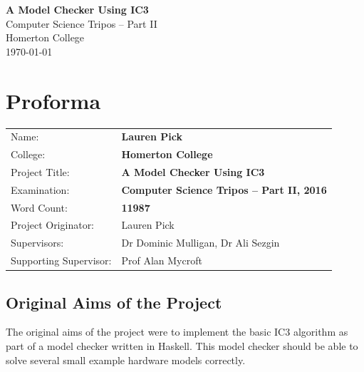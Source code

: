\documentclass[12pt,a4paper,twoside,openright]{report}
\begin{document}






\pagestyle{empty}


\vspace*{60mm}
\begin{center}
\Huge
\textbf{A Model Checker Using IC3} \\[5mm]
Computer Science Tripos -- Part II \\[5mm]
Homerton College \\[5mm]
\today  %
\end{center}


\pagestyle{plain}

\chapter*{Proforma}

{\large
\begin{tabular}{ll}
Name:                  & \bf Lauren Pick                           \\
College:               & \bf Homerton College                      \\
Project Title:         & \bf A Model Checker Using IC3             \\
Examination:        & \bf Computer Science Tripos -- Part II, 2016 \\
Word Count:            & \bf 11987                                 \\
Project Originator:    & Lauren Pick                               \\
Supervisors:           & Dr Dominic Mulligan, Dr Ali Sezgin        \\ 
Supporting Supervisor: & Prof Alan Mycroft
\end{tabular}
}


\section*{Original Aims of the Project}

The original aims of the project were to implement the basic
IC3 algorithm as part of a model checker written in Haskell.
This model checker should be able to
solve several small example hardware models correctly.
\end{document}
